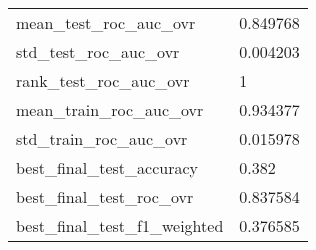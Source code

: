 \begin{tabular}{ll}
mean\_test\_roc\_auc\_ovr         &                                           0.849768 \\
std\_test\_roc\_auc\_ovr          &                                           0.004203 \\
rank\_test\_roc\_auc\_ovr         &                                                  1 \\
mean\_train\_roc\_auc\_ovr        &                                           0.934377 \\
std\_train\_roc\_auc\_ovr         &                                           0.015978 \\
best\_final\_test\_accuracy      &                                              0.382 \\
best\_final\_test\_roc\_ovr       &                                           0.837584 \\
best\_final\_test\_f1\_weighted   &                                           0.376585 \\
\bottomrule
\end{tabular}
